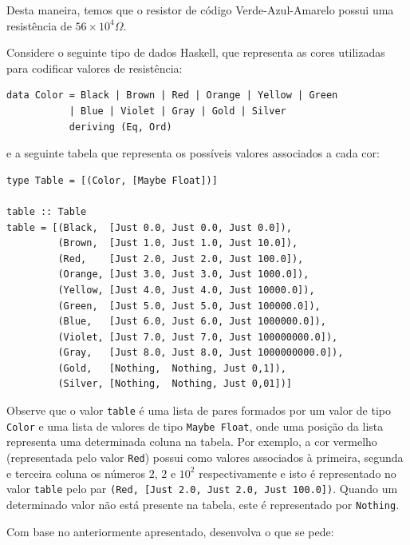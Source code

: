 \documentclass[11pt,a4paper]{article}
\begin{document}
Desta maneira, temos que o resistor de c\'odigo  Verde-Azul-Amarelo possui uma resist\^encia
de $56\times 10^{4}\Omega$.

Considere o seguinte tipo de dados Haskell, que representa as cores utilizadas para codificar valores de resist\^encia:
\begin{verbatim}
data Color = Black | Brown | Red | Orange | Yellow | Green 
           | Blue | Violet | Gray | Gold | Silver
           deriving (Eq, Ord)
\end{verbatim}

e a seguinte tabela que representa os poss\'iveis valores associados a cada cor:

\begin{verbatim}
type Table = [(Color, [Maybe Float])]

table :: Table
table = [(Black,  [Just 0.0, Just 0.0, Just 0.0]),
         (Brown,  [Just 1.0, Just 1.0, Just 10.0]),
         (Red,    [Just 2.0, Just 2.0, Just 100.0]),
         (Orange, [Just 3.0, Just 3.0, Just 1000.0]),
         (Yellow, [Just 4.0, Just 4.0, Just 10000.0]),
         (Green,  [Just 5.0, Just 5.0, Just 100000.0]),
         (Blue,   [Just 6.0, Just 6.0, Just 1000000.0]),
         (Violet, [Just 7.0, Just 7.0, Just 100000000.0]),
         (Gray,   [Just 8.0, Just 8.0, Just 1000000000.0]),
         (Gold,   [Nothing,  Nothing, Just 0,1]),
         (Silver, [Nothing,  Nothing, Just 0,01])]
\end{verbatim}
Observe que o valor \texttt{table} \'e uma lista de pares formados por um valor de tipo \texttt{Color} e 
uma lista de valores de tipo \texttt{Maybe Float}, onde uma posi\c{c}\~ao da lista representa uma determinada coluna na tabela. Por exemplo,
a cor vermelho (representada pelo valor \texttt{Red}) possui como valores associados \`a primeira, segunda e terceira coluna os n\'umeros $2$, $2$ e
$10^{2}$ respectivamente e isto \'e representado no valor \texttt{table} pelo par \texttt{(Red,    [Just 2.0, Just 2.0, Just 100.0])}. Quando um 
determinado valor n\~ao est\'a presente na tabela, este \'e representado por \texttt{Nothing}.

Com base no anteriormente apresentado, desenvolva o que se pede:
\end{document}
